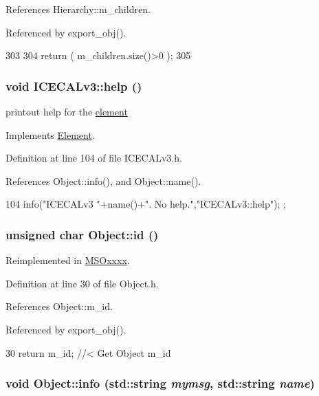 References Hierarchy::m\_\-children.

Referenced by export\_\-obj().


\begin{DoxyCode}
303                               {
304   return ( m_children.size()>0 );
305 }
\end{DoxyCode}
\hypertarget{classICECALv3_a00e572849b4952e7cf04a39f992df037}{
\subsubsection[{help}]{\setlength{\rightskip}{0pt plus 5cm}void ICECALv3::help ()}}
\label{classICECALv3_a00e572849b4952e7cf04a39f992df037}
printout help for the \hyperlink{namespaceelement}{element} 

Implements \hyperlink{classElement_a32c0de27acb08e17251cef88c3e9303a}{Element}.

Definition at line 104 of file ICECALv3.h.

References Object::info(), and Object::name().


\begin{DoxyCode}
104 { info("ICECALv3 "+name()+". No help.","ICECALv3::help"); };
\end{DoxyCode}
\hypertarget{classObject_af99145335cc61ff6e2798ea17db009d2}{
\subsubsection[{id}]{\setlength{\rightskip}{0pt plus 5cm}unsigned char Object::id ()}}
\label{classObject_af99145335cc61ff6e2798ea17db009d2}


Reimplemented in \hyperlink{classMSOxxxx_a0f14b23d31d8e7647184e99a89600cc3}{MSOxxxx}.

Definition at line 30 of file Object.h.

References Object::m\_\-id.

Referenced by export\_\-obj().


\begin{DoxyCode}
30 { return m_id;         } //< Get Object m_id 
\end{DoxyCode}
\hypertarget{classObject_a1ca123253dfd30fc28b156f521dcbdae}{
\subsubsection[{info}]{\setlength{\rightskip}{0pt plus 5cm}void Object::info (std::string {\em mymsg}, \/  std::string {\em name})}}
\label{classObject_a1ca123253dfd30fc28b156f521dcbdae}


